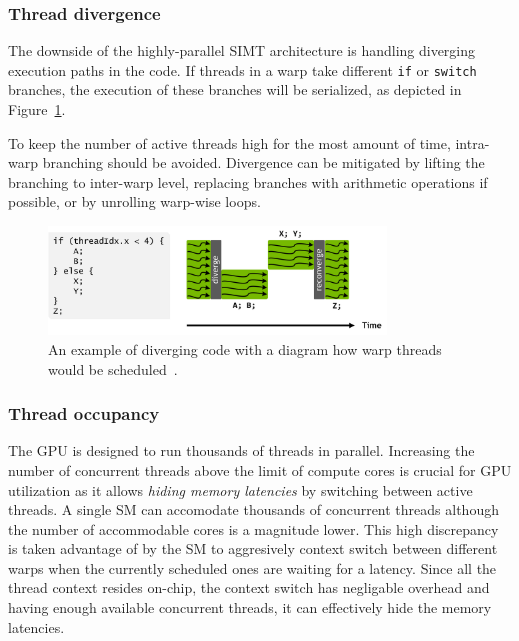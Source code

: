 \subsubsection{Thread divergence}
\label{sec:divergence}

The downside of the highly-parallel SIMT architecture is handling diverging execution paths in the code. If threads in a warp take different \texttt{if} or \texttt{switch} branches, the execution of these branches will be serialized, as depicted in Figure~\ref{fig:divergence}.

To keep the number of active threads high for the most amount of time, intra-warp branching should be avoided. Divergence can be mitigated by lifting the branching to inter-warp level, replacing branches with arithmetic operations if possible, or by unrolling warp-wise loops.

\begin{figure}
    \centering
    \includegraphics[width=0.8\textwidth]{img/divergence.png}
    \caption{An example of diverging code with a diagram how warp threads would be scheduled~\cite{site:volta}.}
    \label{fig:divergence}
\end{figure}

\subsubsection{Thread occupancy}
\label{sec:occupancy}

The GPU is designed to run thousands of threads in parallel. Increasing the number of concurrent threads above the limit of compute cores is crucial for GPU utilization as it allows \emph{hiding memory latencies} by switching between active threads. A single SM can accomodate thousands of concurrent threads although the number of accommodable cores is a magnitude lower. This high discrepancy is taken advantage of by the SM to aggresively context switch between different warps when the currently scheduled ones are waiting for a latency. Since all the thread context resides on-chip, the context switch has negligable overhead and having enough available concurrent threads, it can effectively hide the memory latencies. 

